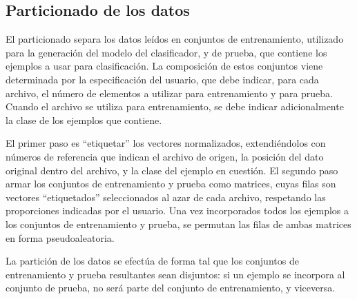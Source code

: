 %
%
%
\subsection{Particionado de los datos}
%
El particionado separa los datos leídos en conjuntos de entrenamiento,
utilizado para la generación del modelo del clasificador, y de prueba,
que contiene los ejemplos a usar para clasificación.
La composición de estos conjuntos viene determinada por la
especificación del usuario, que debe indicar, para cada archivo, el
número de elementos a utilizar para entrenamiento y para prueba.
Cuando el archivo se utiliza para entrenamiento, se debe indicar
adicionalmente la clase de los ejemplos que contiene.

El primer paso es ``etiquetar'' los vectores normalizados, extendiéndolos
con números de referencia que indican el archivo de origen, la
posición del dato original dentro del archivo, y la clase del ejemplo
en cuestión.
El segundo paso armar los conjuntos de entrenamiento y prueba como
matrices, cuyas filas son vectores ``etiquetados'' seleccionados al
azar de cada archivo, respetando las proporciones indicadas por el
usuario.
Una vez incorporados todos los ejemplos a los conjuntos de
entrenamiento y prueba, se permutan las filas de ambas matrices en
forma pseudoaleatoria.

La partición de los datos se efectúa de forma tal que los conjuntos de
entrenamiento y prueba resultantes sean disjuntos: si un ejemplo se
incorpora al conjunto de prueba, no será parte del conjunto de
entrenamiento, y viceversa.
